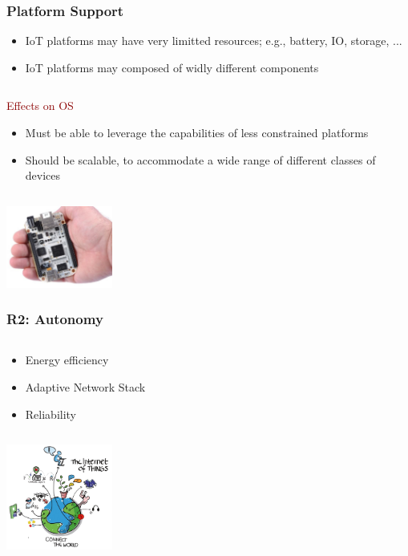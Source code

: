 \documentclass{beamer}
\begin{document}
\begin{frame}
	\frametitle{Platform Support}
	\begin{itemize}
		\justifying
		\item IoT platforms may have very limitted resources; e.g., battery, IO, storage, ...
		\item IoT platforms may composed of widly different components
	\end{itemize}

	\begin{columns}
	\begin{block}{\centering\textcolor{darkred}{Effects on OS}}
		\justifying
		\begin{itemize}
			\item Must be able to leverage the capabilities of less constrained platforms
			\item Should be scalable, to accommodate a wide range of different classes of devices
		\end{itemize}
	\end{block}
	\end{columns}
	\vspace{0.5cm}
	\hspace*{7cm} \includegraphics[width=3.5cm]{figs/hw-platform.jpg}
\end{frame}

\begin{frame}
	\frametitle{R2: Autonomy}
	\begin{columns}[c]
		\begin{column}{30cm}
			\vspace{.1cm}
			\begin{itemize}
				\justifying
				\item Energy efficiency
				\item Adaptive Network Stack
				\item Reliability
			\end{itemize}
		\end{column}
	\end{columns}
	\hspace*{7cm} \includegraphics[width=3.5cm]{figs/Internet-of-Things-3.jpg}
\end{frame}
\end{document}
